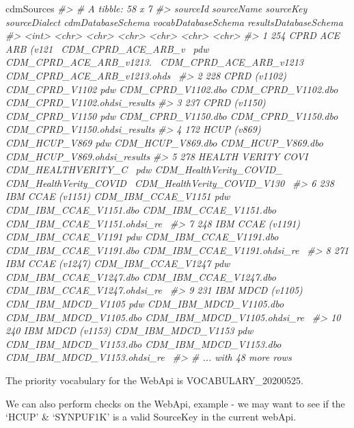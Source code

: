 \documentclass[
]{article}
\newenvironment{Shaded}{\begin{snugshade}}{\end{snugshade}}
\newcommand{\CommentTok}[1]{\textcolor[rgb]{0.56,0.35,0.01}{\textit{#1}}}
\newcommand{\NormalTok}[1]{#1}
\begin{document}
\begin{Shaded}
\begin{Highlighting}[]

\NormalTok{cdmSources}
\CommentTok{#> # A tibble: 58 x 7}
\CommentTok{#>    sourceId sourceName          sourceKey           sourceDialect cdmDatabaseSchema        vocabDatabaseSchema     resultsDatabaseSchema       }
\CommentTok{#>       <int> <chr>               <chr>               <chr>         <chr>                    <chr>                   <chr>                       }
\CommentTok{#>  1      254 CPRD ACE ARB (v121~ CDM_CPRD_ACE_ARB_v~ pdw           CDM_CPRD_ACE_ARB_v1213.~ CDM_CPRD_ACE_ARB_v1213~ CDM_CPRD_ACE_ARB_v1213.ohds~}
\CommentTok{#>  2      228 CPRD (v1102)        CDM_CPRD_V1102      pdw           CDM_CPRD_V1102.dbo       CDM_CPRD_V1102.dbo      CDM_CPRD_V1102.ohdsi_results}
\CommentTok{#>  3      237 CPRD (v1150)        CDM_CPRD_V1150      pdw           CDM_CPRD_V1150.dbo       CDM_CPRD_V1150.dbo      CDM_CPRD_V1150.ohdsi_results}
\CommentTok{#>  4      172 HCUP (v869)         CDM_HCUP_V869       pdw           CDM_HCUP_V869.dbo        CDM_HCUP_V869.dbo       CDM_HCUP_V869.ohdsi_results }
\CommentTok{#>  5      278 HEALTH VERITY COVI~ CDM_HEALTHVERITY_C~ pdw           CDM_HealthVerity_COVID_~ CDM_HealthVerity_COVID~ CDM_HealthVerity_COVID_V130~}
\CommentTok{#>  6      238 IBM CCAE (v1151)    CDM_IBM_CCAE_V1151  pdw           CDM_IBM_CCAE_V1151.dbo   CDM_IBM_CCAE_V1151.dbo  CDM_IBM_CCAE_V1151.ohdsi_re~}
\CommentTok{#>  7      248 IBM CCAE (v1191)    CDM_IBM_CCAE_V1191  pdw           CDM_IBM_CCAE_V1191.dbo   CDM_IBM_CCAE_V1191.dbo  CDM_IBM_CCAE_V1191.ohdsi_re~}
\CommentTok{#>  8      271 IBM CCAE (v1247)    CDM_IBM_CCAE_V1247  pdw           CDM_IBM_CCAE_V1247.dbo   CDM_IBM_CCAE_V1247.dbo  CDM_IBM_CCAE_V1247.ohdsi_re~}
\CommentTok{#>  9      231 IBM MDCD (v1105)    CDM_IBM_MDCD_V1105  pdw           CDM_IBM_MDCD_V1105.dbo   CDM_IBM_MDCD_V1105.dbo  CDM_IBM_MDCD_V1105.ohdsi_re~}
\CommentTok{#> 10      240 IBM MDCD (v1153)    CDM_IBM_MDCD_V1153  pdw           CDM_IBM_MDCD_V1153.dbo   CDM_IBM_MDCD_V1153.dbo  CDM_IBM_MDCD_V1153.ohdsi_re~}
\CommentTok{#> # ... with 48 more rows}
\end{Highlighting}
\end{Shaded}

The priority vocabulary for the WebApi is VOCABULARY\_20200525.

We can also perform checks on the WebApi, example - we may want to see
if the `HCUP' \& `SYNPUF1K' is a valid SourceKey in the current webApi.
\end{document}
